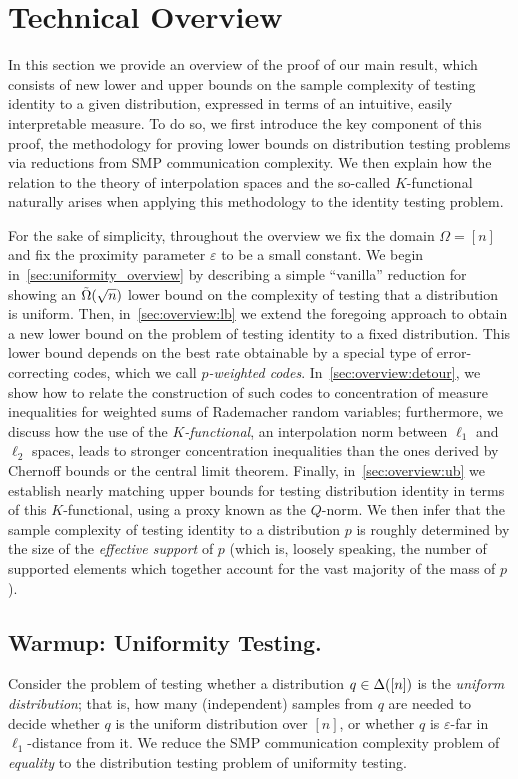 \documentclass[11pt]{article}
\theoremstyle{remark}   	\newtheorem{remark}[theorem]{Remark}
\theoremstyle{definition}   	\newaliascnt{defn}{theorem}
\newcommand{\eps}{\ensuremath{\varepsilon}\xspace}
\newcommand{\tildeOmega}[1]{\operatorname{\tilde{\Omega}}\mleft( #1 \mright)}
\newcommand{\lp}[1][1]{\ell_{#1}}
\begin{document}
\section{Technical Overview}
\label{sec:technical_overview}
In this section we provide an overview of the proof of our main result, which consists of new lower and upper bounds on the sample complexity of testing identity to a given distribution, expressed in terms of an intuitive, easily interpretable measure. To do so, we first introduce the key component of this proof, the methodology for proving lower bounds on distribution testing problems via reductions from SMP communication complexity. We then explain how the relation to the theory of interpolation spaces and the so-called $K$-functional naturally arises when applying this methodology to the identity testing problem.

 For the sake of simplicity, throughout the overview we fix the domain $\Omega = [n]$ and fix the proximity parameter $\eps$ to be a small constant. We begin in~\autoref{sec:uniformity_overview} by describing a simple ``vanilla'' reduction for showing an $\tildeOmega{\sqrt{n}}$ lower bound on the complexity of testing that a distribution is uniform. Then, in~\autoref{sec:overview:lb} we extend the foregoing approach to obtain a new lower bound on the problem of testing identity to a fixed distribution. This lower bound depends on the best rate obtainable by a special type of error-correcting codes, which we call \emph{$p$-weighted codes}. In~\autoref{sec:overview:detour}, we show how to relate the construction of such codes to concentration of measure inequalities for weighted sums of Rademacher random variables; furthermore, we discuss how the use of the \emph{$K$-functional}, an interpolation norm between $\lp[1]$ and $\lp[2]$ spaces, leads to stronger concentration inequalities than the ones derived by Chernoff bounds or the central limit theorem. Finally, in~\autoref{sec:overview:ub} we establish nearly matching upper bounds for testing distribution identity in terms of this $K$-functional, using a proxy known as the $Q$-norm. We then infer that the sample complexity of testing identity to a distribution $p$ is roughly determined by the size of the \emph{effective support} of $p$ (which is, loosely speaking, the number of supported elements which together account for the vast majority of the mass of $p$).

\subsection{Warmup: Uniformity Testing.} 
\label{sec:uniformity_overview}
Consider the problem of testing whether a distribution $q\in\Delta\!\left([n]\right)$ is the \emph{uniform distribution}; that is, how many (independent) samples from $q$ are needed to decide whether $q$ is the uniform distribution over $[n]$, or whether $q$ is $\eps$-far in $\lp[1]$-distance from it. We reduce the SMP communication complexity problem of \emph{equality} to the distribution testing problem of uniformity testing.
\end{document}
